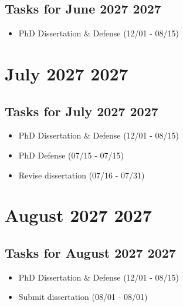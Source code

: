 \documentclass[landscape,a4paper]{article}
\begin{document}
\subsection*{Tasks for June 2027 2027}
\begin{itemize}
\item PhD Dissertation \& Defense (12/01 - 08/15)
\end{itemize}
\newpage

\section*{July 2027 2027}

\begin{center}
\begin{tikzpicture}[scale=0.9]
\end{tikzpicture}
\end{center}

\vspace{1cm}

\subsection*{Tasks for July 2027 2027}
\begin{itemize}
\item PhD Dissertation \& Defense (12/01 - 08/15)
\item PhD Defense (07/15 - 07/15)
\item Revise dissertation (07/16 - 07/31)
\end{itemize}
\newpage

\section*{August 2027 2027}

\begin{center}
\begin{tikzpicture}[scale=0.9]
\end{tikzpicture}
\end{center}

\vspace{1cm}

\subsection*{Tasks for August 2027 2027}
\begin{itemize}
\item PhD Dissertation \& Defense (12/01 - 08/15)
\item Submit dissertation (08/01 - 08/01)
\end{itemize}
\newpage
\end{document}
